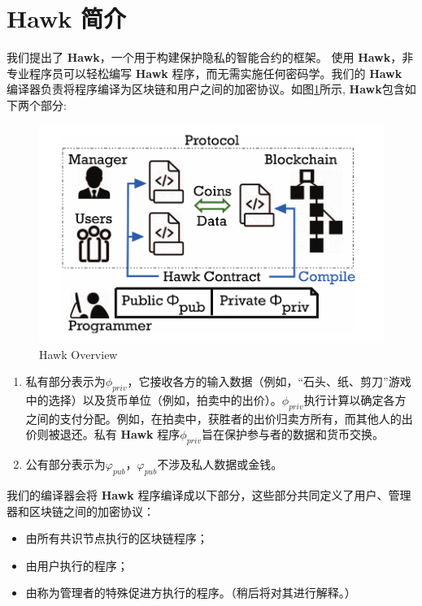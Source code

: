 \documentclass{xduugtrans}
\begin{document}
\section{Hawk 简介}
我们提出了 \textbf{Hawk}，一个用于构建保护隐私的智能合约的框架。 使用 \textbf{Hawk}，非专业程序员可以轻松编写 \textbf{Hawk} 程序，而无需实施任何密码学。我们的 \textbf{Hawk} 编译器负责将程序编译为区块链和用户之间的加密协议。如图\ref{fig1}所示, \textbf{Hawk}包含如下两个部分: 

\begin{figure}
    \centering
    \includegraphics[width=.8\linewidth]{1}
    \caption{Hawk Overview}
    \label{fig1}
\end{figure}

\begin{enumerate}
    \item 私有部分表示为$\phi _{priv}$，它接收各方的输入数据（例如，“石头、纸、剪刀”游戏中的选择）以及货币单位（例如，拍卖中的出价）。$\phi _{priv}$执行计算以确定各方之间的支付分配。例如，在拍卖中，获胜者的出价归卖方所有，而其他人的出价则被退还。私有 \textbf{Hawk} 程序$\phi _{priv}$旨在保护参与者的数据和货币交换。 
    \item 公有部分表示为$\varphi  _{pub}$，$\varphi  _{pub}$不涉及私人数据或金钱。
\end{enumerate}

我们的编译器会将 \textbf{Hawk} 程序编译成以下部分，这些部分共同定义了用户、管理器和区块链之间的加密协议：

\begin{itemize}
    \item 由所有共识节点执行的区块链程序；
    \item 由用户执行的程序；
    \item 由称为管理者的特殊促进方执行的程序。（稍后将对其进行解释。）
\end{itemize}
\end{document}
